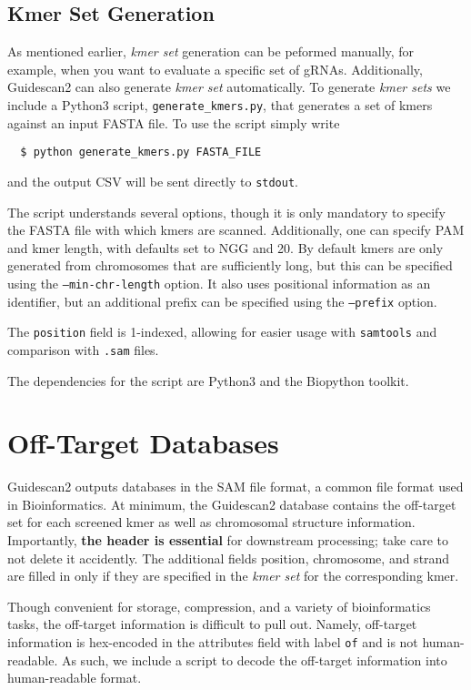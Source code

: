 \documentclass[11pt]{article}
\begin{document}
\subsection{Kmer Set Generation}
As mentioned earlier, {\it kmer set} generation can be peformed manually,
for example, when you want to evaluate a specific set of gRNAs.
Additionally, Guidescan2 can also generate {\it kmer set} automatically.
To generate {\it kmer sets} we include a Python3 script,
\texttt{generate\_kmers.py}, that generates a set of kmers against an
input FASTA file. To use the script simply write
\begin{verbatim}
  $ python generate_kmers.py FASTA_FILE 
\end{verbatim}
and the output CSV will be sent directly to \texttt{stdout}.

The script understands several options, though it is only mandatory to
specify the FASTA file with which kmers are scanned. Additionally, one
can specify PAM and kmer length, with defaults set to NGG and 20. By
default kmers are only generated from chromosomes that are
sufficiently long, but this can be specified using the
\texttt{--min-chr-length} option. It also uses positional information
as an identifier, but an additional prefix can be specified using the
\texttt{--prefix} option.

The \texttt{position} field is 1-indexed, allowing for easier usage
with \texttt{samtools} and comparison with \texttt{.sam} files.
 
The dependencies for the script are Python3 and the Biopython toolkit.

\section{Off-Target Databases}
Guidescan2 outputs databases in the SAM file format, a common file
format used in Bioinformatics. At minimum, the Guidescan2 database
contains the off-target set for each screened kmer as well as
chromosomal structure information. Importantly, \textbf{the header is
  essential} for downstream processing; take care to not delete it
accidently. The additional fields position, chromosome, and strand are
filled in only if they are specified in the {\it kmer set} for the
corresponding kmer. 

Though convenient for storage, compression, and a variety of
bioinformatics tasks, the off-target information is difficult to pull
out. Namely, off-target information is hex-encoded in the attributes
field with label \texttt{of} and is not human-readable. As such, we
include a script to decode the off-target information into
human-readable format.
\end{document}
